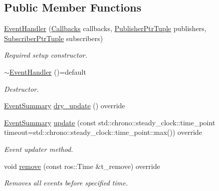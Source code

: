 \subsection*{Public Member Functions}
\begin{DoxyCompactItemize}
\item 
\hyperlink{classflow__ros_1_1_event_handler_a24c8067f4faeef500cd4475b6cdfc33e}{Event\+Handler} (\hyperlink{structflow__ros_1_1_event_handler_1_1_callbacks}{Callbacks} callbacks, \hyperlink{classflow__ros_1_1_event_handler_aced903010cf36b1ce0d9bceb0f7ac64a}{Publisher\+Ptr\+Tuple} publishers, \hyperlink{classflow__ros_1_1_event_handler_a5c37a3eace3da99b2068cfa1fd34449a}{Subscriber\+Ptr\+Tuple} subscribers)
\begin{DoxyCompactList}\small\item\em Required setup constructor. \end{DoxyCompactList}\item 
\mbox{\label{classflow__ros_1_1_event_handler_ae8f5d3a668f27b165cb2702513a9f447}} 
\hyperlink{classflow__ros_1_1_event_handler_ae8f5d3a668f27b165cb2702513a9f447}{$\sim$\+Event\+Handler} ()=default
\begin{DoxyCompactList}\small\item\em Destructor. \end{DoxyCompactList}\item 
\hyperlink{structflow__ros_1_1_event_summary}{Event\+Summary} \hyperlink{classflow__ros_1_1_event_handler_abc2f1821d85ab05d86270cbf20da6cd9}{dry\+\_\+update} () override
\item 
\hyperlink{structflow__ros_1_1_event_summary}{Event\+Summary} \hyperlink{classflow__ros_1_1_event_handler_a445ecc20268a455bf47df8598413ae67}{update} (const std\+::chrono\+::steady\+\_\+clock\+::time\+\_\+point timeout=std\+::chrono\+::steady\+\_\+clock\+::time\+\_\+point\+::max()) override
\begin{DoxyCompactList}\small\item\em Event updater method. \end{DoxyCompactList}\item 
void \hyperlink{classflow__ros_1_1_event_handler_aeaf45592fd8c7fe8c3a4b0da23496d69}{remove} (const ros\+::\+Time \&t\+\_\+remove) override
\begin{DoxyCompactList}\small\item\em Removes all events before specified time. \end{DoxyCompactList}\item 

\end{DoxyCompactItemize}
